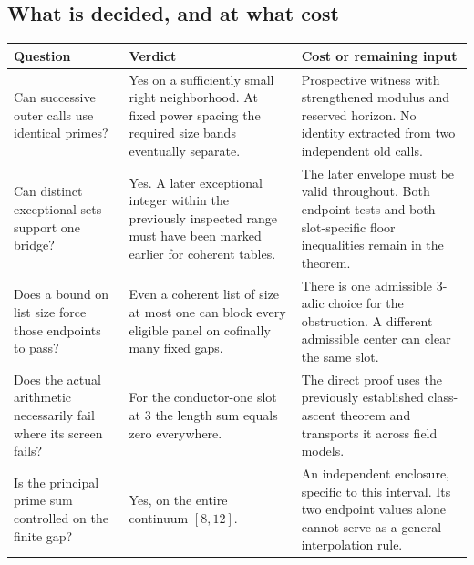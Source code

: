 \documentclass[12pt,letterpaper]{article}
\begin{document}
\subsection{What is decided, and at what cost}
\begin{center}\small\begin{tabularx}{\linewidth}{@{}p{.26\linewidth}YY@{}}\toprule
Question & Verdict & Cost or remaining input\\\midrule
Can successive outer calls use identical primes? & Yes on a sufficiently small right neighborhood. At fixed power spacing the required size bands eventually separate. & Prospective witness with strengthened modulus and reserved horizon. No identity extracted from two independent old calls.\\
Can distinct exceptional sets support one bridge? & Yes. A later exceptional integer within the previously inspected range must have been marked earlier for coherent tables. & The later envelope must be valid throughout. Both endpoint tests and both slot-specific floor inequalities remain in the theorem.\\
Does a bound on list size force those endpoints to pass? & Even a coherent list of size at most one can block every eligible panel on cofinally many fixed gaps. & There is one admissible 3-adic choice for the obstruction. A different admissible center can clear the same slot.\\
Does the actual arithmetic necessarily fail where its screen fails? & For the conductor-one slot at 3 the length sum equals zero everywhere. & The direct proof uses the previously established class-ascent theorem and transports it across field models.\\
Is the principal prime sum controlled on the finite gap? & Yes, on the entire continuum \([8,12]\). & An independent enclosure, specific to this interval. Its two endpoint values alone cannot serve as a general interpolation rule.\\\bottomrule
\end{tabularx}\end{center}
\end{document}
